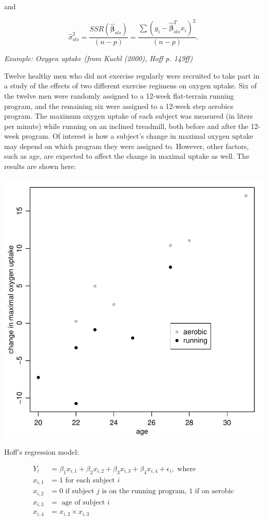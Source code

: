 \documentclass[12pt, a4paper]{article}
\begin{document}
and

$$\hat{\sigma}^2_{ols} = \frac{SSR\left(\hat{\boldsymbol\beta}_{ols}\right)}{(n-p)} = \frac{\sum\left(y_i - \hat{\boldsymbol\beta}_{ols}^T x_i\right)^2}{(n-p)}.$$

\clearpage

\textit{Example:  Oxygen uptake (from Kuehl (2000), Hoff p. 149ff)}

Twelve healthy men who did not exercise regularly were recruited to take part in a study of the effects of two different exercise regimens on oxygen uptake.  Six of the twelve men were randomly assigned to a 12-week flat-terrain running program, and the remaining six were assigned to a 12-week step aerobics program.  The maximum oxygen uptake of each subject was measured (in liters per minute) while running on an inclined treadmill, both before and after the 12-week program.  Of interest is how a subject's change in maximal oxygen uptake may depend on which program they were assigned to.  However, other factors, such as age, are expected to affect the change in maximal uptake as well.  The results are shown here:

\includegraphics{Thesis_v1-011}

Hoff's regression model:

    \begin{align}
        Y_i &= \beta_1x_{i,1} + \beta_2x_{i,2} + \beta_3x_{i,3} + \beta_4x_{i,4} + \epsilon_i, \text{ where} \label{example_regression_model}\\
        x_{i,1} &= 1 \text{ for each subject } i \nonumber \\
        x_{i,2} &= 0 \text{ if subject } j \text{ is on the running program, } 1 \text{ if on aerobic} \nonumber \\
        x_{i,3} &= \text{ age of subject } i \nonumber \\
        x_{i,4} &= x_{i,2} \times x_{i,3} \nonumber
    \end{align}
\end{document}
